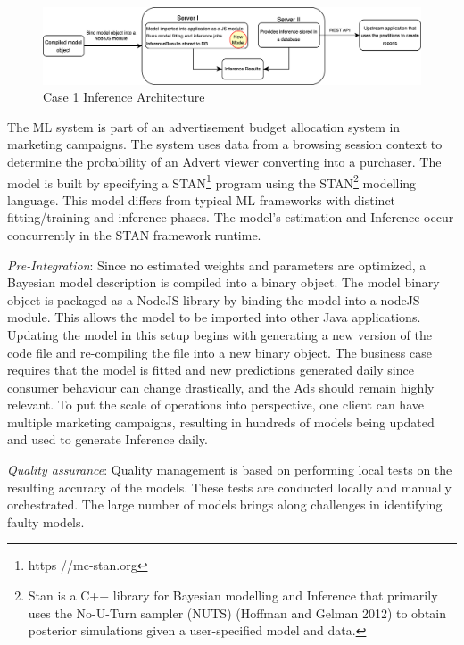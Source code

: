 \begin{figure}[b]
\centering
\includegraphics[width=\linewidth]{images/case1_deployment_process.png}
\caption{Case 1 Inference Architecture}
\label{fig: case1_deployment_process}
\end{figure}

The ML system is part of an advertisement budget allocation system in marketing campaigns. The system uses data from a browsing session context to determine the probability of an Advert viewer converting into a purchaser. The model is built by specifying a STAN\footnote{https //mc-stan.org} program using the STAN\footnote{Stan is a C++ library for Bayesian modelling and Inference that primarily uses the No-U-Turn sampler (NUTS) (Hoffman and Gelman 2012) to obtain posterior simulations given a user-specified model and data.} modelling language. This model differs from typical ML frameworks with distinct fitting/training and inference phases. The model's estimation and Inference occur concurrently in the STAN framework runtime.

\textit{Pre-Integration}: Since no estimated weights and parameters are optimized, a Bayesian model description is compiled into a binary object. The model binary object is packaged as a NodeJS library by binding the model into a nodeJS module. This allows the model to be imported into other Java applications. Updating the model in this setup begins with generating a new version of the code file and re-compiling the file into a new binary object. The business case requires that the model is fitted and new predictions generated daily since consumer behaviour can change drastically, and the Ads should remain highly relevant. To put the scale of operations into perspective, one client can have multiple marketing campaigns, resulting in hundreds of models being updated and used to generate Inference daily.

\textit{Quality assurance}: Quality management is based on performing local tests on the resulting accuracy of the models. These tests are conducted locally and manually orchestrated. The large number of models brings along challenges in identifying faulty models.

